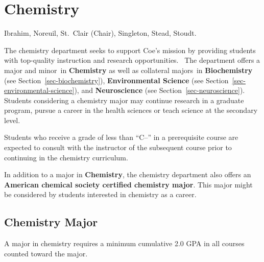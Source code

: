 \documentclass[
  letterpaper,
]{scrbook}
\begin{document}
\section{Chemistry}\label{sec-chemistry}

Ibrahim, Noreuil, St.~Clair (Chair), Singleton, Stead, Stoudt.

The chemistry department seeks to support Coe's mission by providing
students with top-quality instruction and research opportunities.~ The
department offers a major and minor~in \textbf{Chemistry} as well as
collateral majors~in \textbf{Biochemistry} (see
Section~\ref{sec-biochemistry}), \textbf{Environmental Science} (see
Section~\ref{sec-environmental-science}), and \textbf{Neuroscience} (see
Section~\ref{sec-neuroscience}).~ Students considering a chemistry major
may continue research in a graduate program, pursue a career in the
health sciences or teach science at the secondary level.

Students who receive a grade of less than ``C--'' in a prerequisite
course are expected to consult with the instructor of the subsequent
course prior to continuing in the chemistry curriculum.

In addition to a major in \textbf{Chemistry}, the chemistry department
also offers an \textbf{American chemical society certified chemistry
major}. This major might be considered by students interested in
chemistry as a career.

\subsection{Chemistry Major}\label{chemistry-major}

A major in chemistry requires a minimum cumulative 2.0 GPA in all
courses counted toward the major.
\end{document}
